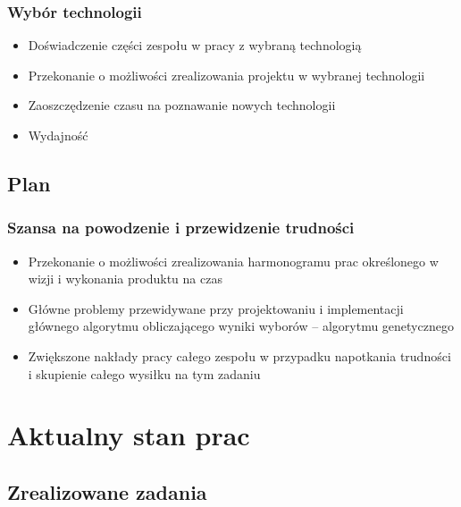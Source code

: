 \documentclass{beamer}
\begin{document}
\begin{frame}

\frametitle{Wybór technologii}
\begin{itemize}
\item Doświadczenie części zespołu w pracy z wybraną technologią
\item Przekonanie o możliwości zrealizowania projektu w wybranej technologii
\item Zaoszczędzenie czasu na poznawanie nowych technologii
\item Wydajność
\end{itemize}

\end{frame}


\subsection{Plan}

\begin{frame}

\frametitle{Szansa na powodzenie i przewidzenie trudności}
\begin{itemize}
\item Przekonanie o możliwości zrealizowania harmonogramu prac określonego w wizji i wykonania produktu na czas
\item Główne problemy przewidywane przy projektowaniu i implementacji głównego algorytmu obliczającego wyniki wyborów – algorytmu genetycznego
\item Zwiększone nakłady pracy całego zespołu w przypadku napotkania trudności i skupienie całego wysiłku na tym zadaniu
\end{itemize}

\end{frame}


\section{Aktualny stan prac}

\subsection{Zrealizowane zadania}
\end{document}
